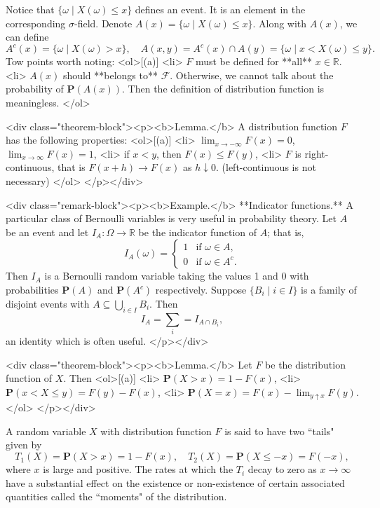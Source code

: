 Notice that $\{ \omega \;\vert\; X(\omega) \leq x\}$ defines an event. It is an element in the corresponding $\sigma$-field. Denote $A(x) = \{ \omega \;\vert\; X(\omega) \leq x \}$. Along with $A(x)$, we can define
$$\begin{equation}
    A^c(x) = \{ \omega \;\vert\; X(\omega) > x \}, \quad A(x, y) = A^c(x) \cap A(y) = \{ \omega \;\vert\; x < X(\omega) \leq y \}.
\end{equation}$$
Tow points worth noting:
<ol>[(a)]
    <li> $F$ must be defined for **all** $x \in \mathbb{R}$.
    <li> $A(x)$ should **belongs to** $\mathcal{F}$. Otherwise, we cannot talk about the probability of $\mathbf{P}(A(x))$. Then the definition of distribution function is meaningless.
</ol>

<div class="theorem-block"><p><b>Lemma.</b> 
A distribution function $F$ has the following properties:
<ol>[(a)]
    <li> $\lim_{x \to -\infty}F(x) = 0$, $\lim_{x\to\infty} F(x) = 1$,
    <li> if $x < y$, then $F(x) \leq F(y)$,
    <li> $F$ is right-continuous, that is $F(x+h) \to F(x)$ as $h \downarrow 0$. (left-continuous is not necessary)
</ol>
</p></div>

<div class="remark-block"><p><b>Example.</b> 
**Indicator functions.** A particular class of Bernoulli variables is very useful in probability theory. Let $A$ be an event and let $I_A : \Omega \to \mathbb{R}$ be the indicator function of $A$; that is,
$$\begin{equation}
    I_A(\omega) = \begin{cases} 1 & \text{if $\omega \in A$}, \\ 0 & \text{if $\omega \in A^c$}. \end{cases}
\end{equation}$$
Then $I_A$ is a Bernoulli random variable taking the values 1 and 0 with probabilities $\mathbf{P}(A)$ and $\mathbf{P}(A^c)$ respectively. Suppose $\{B_i \;\vert\; i \in I\}$ is a family of disjoint events with $A \subseteq \bigcup_{i\in I} B_i$. Then 
$$\begin{equation}
    I_A = \sum_{i} = I_{A\cap B_i},
\end{equation}$$
an identity which is often useful.
</p></div>

<div class="theorem-block"><p><b>Lemma.</b> 
Let $F$ be the distribution function of $X$. Then
<ol>[(a)]
    <li> $\mathbf{P}(X>x) = 1-F(x)$, 
    <li> $\mathbf{P}(x < X \leq y) = F(y) - F(x)$,
    <li> $\mathbf{P}(X = x) = F(x) - \lim_{y \uparrow x} F(y)$.
</ol>
</p></div>

A random variable $X$ with distribution function $F$ is said to have two ``tails" given by 
$$\begin{equation}
    T_1 (X) = \mathbf{P}(X > x) = 1 - F(x), \quad T_2(X) = \mathbf{P}(X \leq -x) = F(-x),    
\end{equation}$$
where $x$ is large and positive. The rates at which the $T_i$ decay to zero as $x\to\infty$ have a substantial effect on the existence or non-existence of certain associated quantities called the ``moments" of the distribution. 


